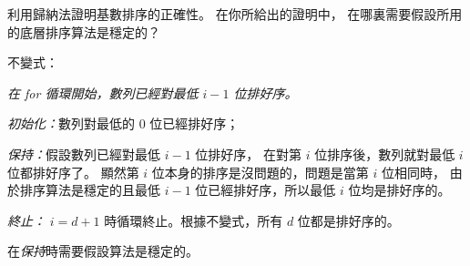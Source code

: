 \startEXERCISE
利用歸納法證明基數排序的正確性。
在你所給出的證明中，
在哪裏需要假設所用的底層排序算法是穩定的？
\stopEXERCISE

\startANSWER
不變式：

\emph{在 for 循環開始，數列已經對最低 $i-1$ 位排好序。}

\emph{初始化：}數列對最低的 0 位已經排好序；

\emph{保持：}假設數列已經對最低 $i-1$ 位排好序，
在對第 $i$ 位排序後，數列就對最低 $i$ 位都排好序了。
顯然第 $i$ 位本身的排序是沒問題的，問題是當第 $i$ 位相同時，
由於排序算法是穩定的且最低 $i-1$ 位已經排好序，所以最低 $i$ 位均是排好序的。

\emph{終止：} $i=d+1$ 時循環終止。根據不變式，所有 $d$ 位都是排好序的。

在\emph{保持}時需要假設算法是穩定的。
\stopANSWER
